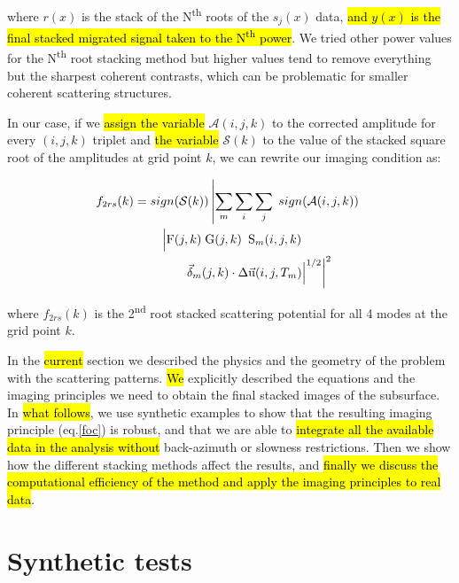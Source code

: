 \documentclass[10pt,a4paper]{article}
\begin{document}
\noindent where $r(x)$ is the stack of the N\textsuperscript{th} roots of the $s_j(x)$ data,
\hl{and $y(x)$ is the final stacked migrated signal taken to the N\textsuperscript{th} power}.
We tried other power values for the N\textsuperscript{th} root stacking method but higher values tend to remove everything but the sharpest coherent contrasts, which can be problematic for smaller coherent scattering structures.

In our case, if we \hl{assign the variable} $\mathcal{A}(i,j,k)$ to the corrected amplitude for every $(i,j,k)$ triplet and \hl{the variable} $\mathcal{S}(k)$ to the value of the stacked square root of the amplitudes at grid point $k$, we can rewrite our imaging condition as:

\begin{align}
  f_{2rs}(k) &= sign(\mathcal{S}(k)) \left\vert \sum_m \sum_i \sum_j \; sign(\mathcal{A}(i,j,k)) \; \right.\notag\\&\qquad\left. \Big\vert \text{F}(j,k) \; \text{G}(j,k) \tfrac{}{}\; \text{S}_{m}(i,j,k) \; \right.\notag\\&\qquad\qquad\left. \vec{\delta}_{m}(j,k) \cdot \Delta\vec{\text{u}}(i,j,T_m)\Big\vert^{1/2} \right\vert ^2
  \label{2rs}
\end{align}
\vspace{1mm}

\noindent where $f_{2rs}(k)$ is the 2\textsuperscript{nd} root stacked scattering potential for all 4 modes at the grid point $k$.

In the \hl{current} section we described the physics and the geometry of the problem with the scattering patterns.
\hl{We} explicitly described the equations and the imaging principles we need to obtain the final stacked images of the subsurface.
In \hl{what follows}, we use synthetic examples to show that the resulting imaging principle (eq.\eqref{foc}) is robust, and that we are able to \hl{integrate all the available data in the analysis without} back-azimuth or slowness restrictions.
Then we show how the different stacking methods affect the results, and \hl{finally we discuss the computational efficiency of the method and apply the imaging principles to real data}. 


\section{Synthetic tests}
\end{document}
